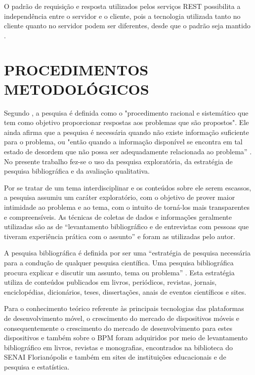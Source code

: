 \documentclass[
	12pt,				%
	openright,			%
	oneside,			%
	a4paper,			%
	chapter=TITLE,		%
	section=TITLE,		%
	english,			%
	french,				%
	spanish,			%
	brazil				%
	]{abntex2}
\begin{document}
O padrão de requisição e resposta utilizados pelos serviços REST possibilita a independência entre o servidor e o cliente, pois a tecnologia utilizada tanto no cliente quanto no servidor podem ser diferentes, desde que o padrão seja mantido \cite{restPhpJquery}.



\chapter{PROCEDIMENTOS METODOLÓGICOS}

Segundo , a pesquisa é definida como o "procedimento racional e sistemático que tem como objetivo proporcionar respostas aos problemas que são propostos". Ele ainda afirma que a pesquisa é necessária quando não existe informação suficiente para o problema, ou "então quando a informação disponível se encontra em tal estado de desordem que não possa ser adequadamente relacionada ao problema” \cite[p. 1]{gilPesquisa}. No presente trabalho fez-se o uso da pesquisa exploratória, da estratégia de pesquisa bibliográfica e da avaliação qualitativa.

Por se tratar de um tema interdisciplinar e os conteúdos sobre ele serem escassos, a pesquisa assumiu um caráter exploratório, com o objetivo de prover maior intimidade ao problema e ao tema, com o intuito de torná-los mais transparentes e compreensíveis. As técnicas de coletas de dados e informações geralmente utilizadas são as de “levantamento bibliográfico e de entrevistas com pessoas que tiveram experiência prática com o assunto” \cite[p. 27]{gilPesquisa} e foram as utilizadas pelo autor.

A pesquisa bibliográfica é definida por ser uma “estratégia de pesquisa necessária para a condução de qualquer pesquisa científica. Uma pesquisa bibliográfica procura explicar e discutir um assunto, tema ou problema” \cite[p. 54]{martinsTheophiloMetodologia}. Esta estratégia utiliza de conteúdos publicados em livros, periódicos, revistas, jornais, enciclopédias, dicionários, teses, dissertações, anais de eventos científicos e sites.

Para o conhecimento teórico referente às principais tecnologias das plataformas de desenvolvimento móvel, o crescimento do mercado de dispositivos móveis e consequentemente o crescimento do mercado de desenvolvimento para estes dispositivos e também sobre o BPM foram adquiridos por meio de levantamento bibliográfico em livros, revistas e monografias, encontrados na biblioteca do SENAI Florianópolis e também em sites de instituições educacionais e de pesquisa e estatística.
\end{document}
